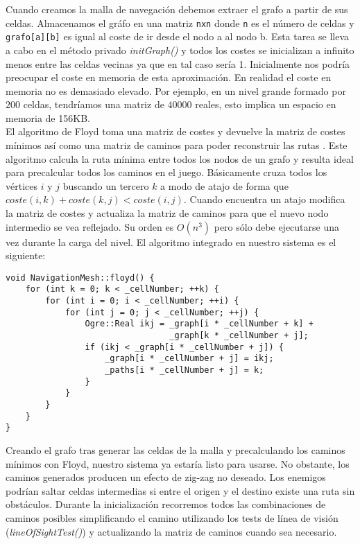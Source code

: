 Cuando creamos la malla de navegación debemos extraer el grafo a partir
de sus celdas. Almacenamos el gráfo en una matriz \texttt{nxn} donde \texttt{n}
es el número de celdas y \texttt{grafo[a][b]} es igual al coste de ir desde
el nodo a al nodo b. Esta tarea se lleva a cabo en el método privado \textit{initGraph()}
y todos los costes se inicializan a infinito menos entre las celdas vecinas ya
que en tal caso sería 1. Inicialmente nos podría preocupar el coste en memoria
de esta aproximación. En realidad el coste en memoria no es demasiado elevado.
Por ejemplo, en un nivel grande formado por $200$ celdas, tendríamos una matriz de $40000$
reales, esto implica un espacio en memoria de 156KB.\\

El algoritmo de Floyd toma una matriz de costes y devuelve la matriz de costes
mínimos así como una matriz de caminos para poder reconstruir las rutas \cite{website:floyd}.
Este algoritmo calcula la ruta mínima entre todos los nodos de un grafo y resulta
ideal para precalcular todos los caminos en el juego. Básicamente cruza
todos los vértices $i$ y $j$ buscando un tercero $k$ a modo de atajo de forma
que $coste(i, k) + coste(k, j) < coste(i, j)$. Cuando encuentra un atajo
modifica la matriz de costes y actualiza la matriz de caminos para que el
nuevo nodo intermedio se vea reflejado. Su orden es $O(n^{3})$ pero sólo
debe ejecutarse una vez durante la carga del nivel. El algoritmo integrado en nuestro
sistema es el siguiente:\\

\begin{lstlisting}[style=C++]
void NavigationMesh::floyd() {
    for (int k = 0; k < _cellNumber; ++k) {
        for (int i = 0; i < _cellNumber; ++i) {
            for (int j = 0; j < _cellNumber; ++j) {
                Ogre::Real ikj = _graph[i * _cellNumber + k] +
                                 _graph[k * _cellNumber + j];
                if (ikj < _graph[i * _cellNumber + j]) {
                    _graph[i * _cellNumber + j] = ikj;
                    _paths[i * _cellNumber + j] = k;
                }
            }
        }
    }
}
\end{lstlisting}

Creando el grafo tras generar las celdas de la malla y precalculando los
caminos mínimos con Floyd, nuestro sistema ya estaría listo para usarse.
No obstante, los caminos generados producen un efecto de zig-zag no deseado.
Los enemigos podrían saltar celdas intermedias si entre el origen y el destino
existe una ruta sin obstáculos. Durante la inicialización recorremos todos
las combinaciones de caminos posibles simplificando el camino utilizando
los tests de línea de visión (\textit{lineOfSightTest()}) y actualizando
la matriz de caminos cuando sea necesario.\\

